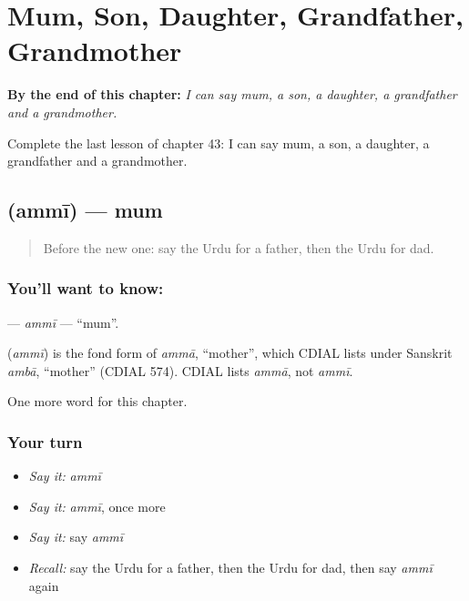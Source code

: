 
\chapter{Mum, Son, Daughter, Grandfather, Grandmother}
\label{ch:ur-mum-son-daughter-grandfather-grandmother}

\begin{chapteropening}
\textbf{By the end of this chapter:} \emph{I can say mum, a son, a daughter, a grandfather and a grandmother.}

Complete the last lesson of chapter 43: I can say mum, a son, a daughter, a grandfather and a grandmother.
\end{chapteropening}

\section[\texorpdfstring{\ur{امی} (ammī)}{امی (ammī)}]{ (ammī) — mum}

\label{lesson:UR-C43-ammi}



\begin{quote}
Before the new one: say the Urdu for a father, then the Urdu for dad.
\end{quote}

\subsection*{You'll want to know: }
\textbf{} — \emph{ammī} — \textquotedblleft{}mum\textquotedblright{}.

\begin{cousinweb}
\textbf{} (\emph{ammī}) is the fond form of \emph{ammā}, \textquotedblleft{}mother\textquotedblright{}, which CDIAL lists under Sanskrit \emph{ambā}, \textquotedblleft{}mother\textquotedblright{} (CDIAL 574). CDIAL lists \emph{ammā}, not \emph{ammī}.
\end{cousinweb}

\begin{grammarlens}[title={What you've built}]
One more word for this chapter.
\end{grammarlens}

\subsection*{Your turn}
\begin{itemize}
\raggedright
  \item \emph{Say it:} \emph{ammī}
  \item \emph{Say it:} \emph{ammī}, once more
  \item \emph{Say it:} say \emph{ammī}
  \item \emph{Recall:} say the Urdu for a father, then the Urdu for dad, then say \emph{ammī} again
\end{itemize}

